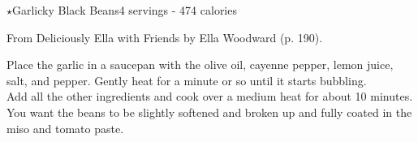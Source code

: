 \begin{recipe}{\texorpdfstring{$\star$}{str}Garlicky Black Beans}{4 servings - 474 calories}{}

\freeform From {\normalfont Deliciously Ella with Friends} by Ella Woodward (p. 190).


Place the garlic in a saucepan with the olive oil, cayenne pepper, lemon juice, salt, and pepper. Gently heat for a minute or so until it starts bubbling.\\

Add all the other ingredients and cook over a medium heat for about 10 minutes. You want the beans to be slightly softened and broken up and fully coated in the miso and tomato paste.

\end{recipe}
